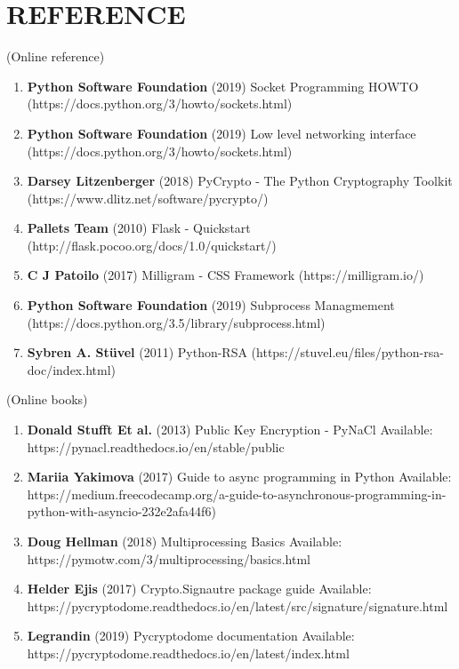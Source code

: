 \chapter*{\rm \large \bf REFERENCE}
\vspace{4.0mm}
\setlength{\parindent}{1cm} 

\scriptsize{(Online reference)}
\begin{enumerate}
    \item \textbf{Python Software Foundation} (2019) Socket Programming HOWTO
        (https://docs.python.org/3/howto/sockets.html)

    \item \textbf{Python Software Foundation} (2019) Low level networking
        interface (https://docs.python.org/3/howto/sockets.html)

    \item \textbf{Darsey Litzenberger} (2018) PyCrypto - The Python Cryptography
        Toolkit (https://www.dlitz.net/software/pycrypto/)

    \item \textbf{Pallets Team} (2010) Flask - Quickstart
        (http://flask.pocoo.org/docs/1.0/quickstart/)

    \item \textbf{C J Patoilo} (2017) Milligram - CSS Framework
        (https://milligram.io/)

    \item \textbf{Python Software Foundation} (2019) Subprocess Managmement
        (https://docs.python.org/3.5/library/subprocess.html)

    \item \textbf{Sybren A. Stüvel} (2011) Python-RSA
        (https://stuvel.eu/files/python-rsa-doc/index.html)
\end{enumerate}

\scriptsize{(Online books)}
\begin{enumerate}
    \item \textbf{Donald Stufft Et al.} (2013) Public Key Encryption - PyNaCl
        Available: https://pynacl.readthedocs.io/en/stable/public

    \item \textbf{Mariia Yakimova} (2017) Guide to async programming in Python
        Available: https://medium.freecodecamp.org/a-guide-to-asynchronous-programming-in-python-with-asyncio-232e2afa44f6)

    \item \textbf{Doug Hellman} (2018) Multiprocessing Basics
        Available: https://pymotw.com/3/multiprocessing/basics.html

    \item \textbf{Helder Ejis} (2017) Crypto.Signautre package guide
        Available: https://pycryptodome.readthedocs.io/en/latest/src/signature/signature.html

    \item \textbf{Legrandin} (2019) Pycryptodome documentation
        Available: https://pycryptodome.readthedocs.io/en/latest/index.html
\end{enumerate}

\newpage
